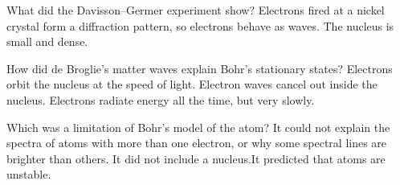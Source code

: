 \begin{quizq}{}
What did the Davisson--Germer experiment show?
  {Electrons fired at a nickel crystal form a diffraction pattern, so electrons behave as waves.}
  {The nucleus is small and dense.}
\end{quizq}

\begin{quizq}{}
How did de Broglie's matter waves explain Bohr's stationary states?
  {Electrons orbit the nucleus at the speed of light.}
  {Electron waves cancel out inside the nucleus.}
  {Electrons radiate energy all the time, but very slowly.}
\end{quizq}

\begin{quizq}{}
Which was a limitation of Bohr's model of the atom?
  {It could not explain the spectra of atoms with more than one electron, or why some spectral lines
   are brighter than others.}
  {It did not include a nucleus.}{It predicted that atoms are unstable.}
\end{quizq}
